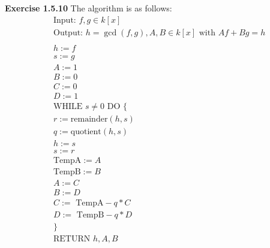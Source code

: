 \documentclass[12pt,oneside]{article}
\newenvironment{exercise}[1]{\vspace{.1in}\noindent\textbf{Exercise #1 \hspace{.05em}}}{}
\begin{document}
\begin{exercise}{1.5.10}
    The algorithm is as follows:
    \begin{align*}
        &\text{Input: }f,g \in k[x]\\
        &\text{Output: }h=\gcd(f,g),A,B \in k[x] \text{ with } Af+Bg=h\\
        \\
        &h:=f\\
        &s:=g\\
        &A:=1\\
        &B:=0\\
        &C:=0\\
        &D:=1\\
        &\text{WHILE }s \neq 0 \text{ DO \{}\\
        &r:= \text{remainder}(h,s)\\
        &q:= \text{quotient}(h,s)\\
        &h:=s\\
        &s:=r\\
        &\text{TempA}:=A\\
        &\text{TempB}:=B\\
        &A:=C\\
        &B:=D\\
        &C:=\text{ TempA}-q*C\\
        &D:=\text{ TempB}-q*D\\
        &\}\\
        &\text{RETURN }h,A,B
    \end{align*}
\end{exercise}

\end{document}
